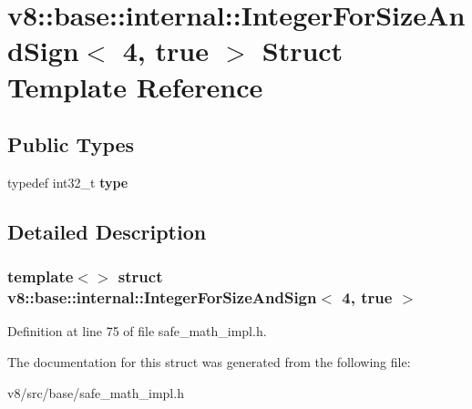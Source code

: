 \hypertarget{structv8_1_1base_1_1internal_1_1IntegerForSizeAndSign_3_014_00_01true_01_4}{}\section{v8\+:\+:base\+:\+:internal\+:\+:Integer\+For\+Size\+And\+Sign$<$ 4, true $>$ Struct Template Reference}
\label{structv8_1_1base_1_1internal_1_1IntegerForSizeAndSign_3_014_00_01true_01_4}
\subsection*{Public Types}
\begin{DoxyCompactItemize}
\item 
\mbox{\label{structv8_1_1base_1_1internal_1_1IntegerForSizeAndSign_3_014_00_01true_01_4_a6e0dcbaf5e4d56a2c775cb9b27a1cdeb}} 
typedef int32\+\_\+t {\bfseries type}
\end{DoxyCompactItemize}


\subsection{Detailed Description}
\subsubsection*{template$<$$>$\newline
struct v8\+::base\+::internal\+::\+Integer\+For\+Size\+And\+Sign$<$ 4, true $>$}



Definition at line 75 of file safe\+\_\+math\+\_\+impl.\+h.



The documentation for this struct was generated from the following file\+:\begin{DoxyCompactItemize}
\item 
v8/src/base/safe\+\_\+math\+\_\+impl.\+h\end{DoxyCompactItemize}
